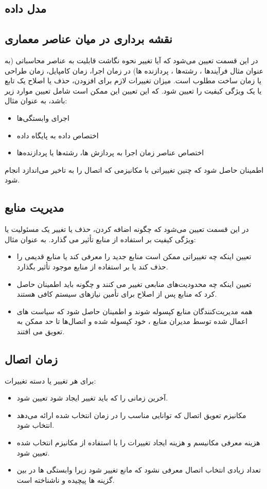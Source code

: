 \subsection{مدل داده}

\subsection{نقشه برداری در میان عناصر معماری}
در این قسمت تعیین می‌شود که آیا تغییر نحوه نگاشت قابلیت به عناصر محاسباتی (به عنوان مثال فرآیندها ، رشته‌ها ، پردازنده ها) در زمان اجرا، زمان کامپایل، زمان طراحی یا زمان ساخت مطلوب است.
میزان تغییرات لازم برای افزودن، حذف یا اصلاح یک تابع یا یک ویژگی کیفیت را تعیین شود. که این تعیین این ممکن است شامل تعیین موارد زیر باشد، به عنوان مثال:
\begin{itemize}
\item
اجرای وابستگی‌ها
\item
اختصاص داده به پایگاه داده
\item
اختصاص عناصر زمان اجرا به پردازش ها‌، رشته‌ها یا پردازنده‌ها
\end{itemize}
اطمینان حاصل شود که چنین تغییراتی با مکانیزمی که اتصال را به تاخیر می‌اندازد انجام شود.

\subsection{مدیریت منابع}
در این قسمت تعیین می‌شود که چگونه اضافه کردن، حذف یا تغییر یک مسئولیت یا ویژگی کیفیت بر استفاده از منابع تأثیر می گذارد.
به عنوان مثال: 
\begin{itemize}
\item
تعیین اینکه چه تغییراتی ممکن است منابع جدید را معرفی کند یا منابع قدیمی را حذف کند یا بر استفاده از منابع موجود تأثیر بگذارد.
\item
تعیین اینکه چه محدودیت‌های منابعی تغییر می کنند و چگونه باید اطمینان حاصل کرد که منابع پس از اصلاح برای تأمین نیازهای سیستم کافی هستند.
\item
همه مدیریت‌کنندگان منابع کپسوله شوند و اطمینان حاصل شود که سیاست های اعمال شده توسط مدیران منابع ، خود کپسوله شده و اتصال‌ها تا حد ممکن به تعویق می افتند.
\end{itemize}

\subsection{زمان اتصال}
برای هر تغییر یا دسته تغییرات:
\begin{itemize}
\item
آخرین زمانی را که باید تغییر ایجاد شود تعیین شود.
\item
مکانیزم تعویق اتصال که توانایی مناسب را در زمان انتخاب شده ارائه می‌دهد انتخاب شود.
\item
هزینه معرفی مکانیسم و هزینه ایجاد تغییرات را با استفاده از مکانیزم انتخاب شده تعیین شود.
\item
تعداد زیادی انتخاب اتصال معرفی نشود که مانع تغییر شود زیرا وابستگی ها در بین گزینه ها پیچیده و ناشناخته است.
\end{itemize}
